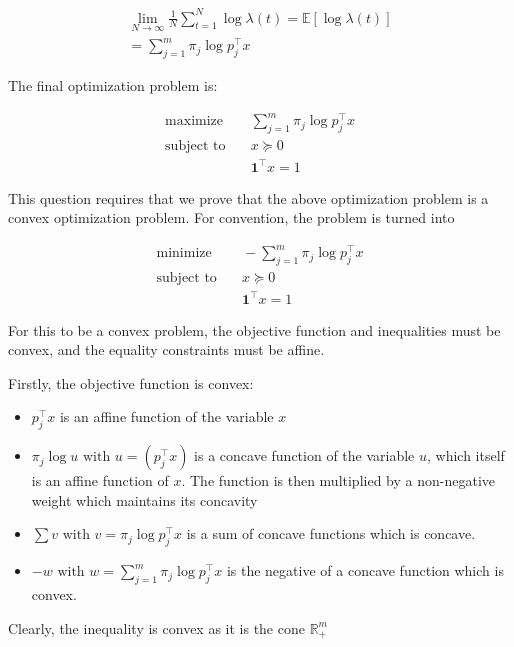 \begin{equation}
  \begin{aligned}
    \lim_{N \to \infty} \frac{1}{N} \sum_{t=1}^N \log \lambda(t) = \mathbb{E}[\log \lambda(t)] \\ 
    = \sum_{j=1}^m \pi_j \log p_j^\top x
  \end{aligned}
\end{equation}

The final optimization problem is:

\begin{align}
  \text{maximize} & \quad \sum_{j=1}^m \pi_j \log p_j^\top x \\
  \text{subject to} & \quad x \succeq 0  \\
  & \quad \textbf{1}^\top x = 1
\end{align}

This question requires that we prove that the above optimization problem is a convex optimization problem. For convention, the problem is turned into

\begin{align}
  \text{minimize} & \quad -\sum_{j=1}^m \pi_j \log p_j^\top x \\
  \text{subject to} & \quad x \succeq 0  \\
  & \quad \textbf{1}^\top x = 1
\end{align}

For this to be a convex problem, the objective function and inequalities must be convex, and the equality constraints must be affine.

Firstly, the objective function is convex:
\begin{itemize}
  \item $p_j^\top x $ is an affine function of the variable $x$
  \item $ \pi_j \log u \text{ with } u = (p_j^\top x)$ is a concave function of the variable $u$, which itself is an affine function of $x$. The function is then multiplied by a non-negative weight which maintains its concavity
  \item $\sum v \text{ with } v = \pi_j \log p_j^\top x$ is a sum of concave functions which is concave.
  \item $- w \text{ with } w = \sum_{j=1}^m \pi_j \log p_j^\top x$ is the negative of a concave function which is convex.
\end{itemize}

Clearly, the inequality is convex as it is the cone $\mathbb{R}^m_{+}$

